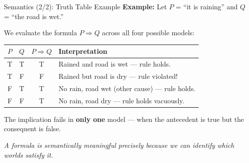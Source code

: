 \documentclass[10pt]{beamer}
\begin{document}
\begin{frame}{Semantics (2/2): Truth Table Example}
    \textbf{Example:} Let $P$ = ``it is raining'' and $Q$ = ``the road is wet.''

    \vspace{0.2cm}
    We evaluate the formula $P \Rightarrow Q$ across all four possible models:

    \vspace{0.15cm}
    \begin{center}
    \renewcommand{\arraystretch}{1.3}
    \begin{tabular}{cc|cl}
        \toprule
        $P$ & $Q$ & $P \Rightarrow Q$ & Interpretation \\
        \midrule
        T & T & T & Rained and road is wet — rule holds. \\
        T & F & \alert{F} & Rained but road is dry — \alert{rule violated!} \\
        F & T & T & No rain, road wet (other cause) — rule holds. \\
        F & F & T & No rain, road dry — rule holds vacuously. \\
        \bottomrule
    \end{tabular}
    \end{center}

    \vspace{0.2cm}
    The implication fails in \textbf{only one} model — when the antecedent is true but the consequent is false.

    \vspace{0.1cm}
    \textit{A formula is semantically meaningful precisely because we can identify which worlds satisfy it.}
\end{frame}
\end{document}
